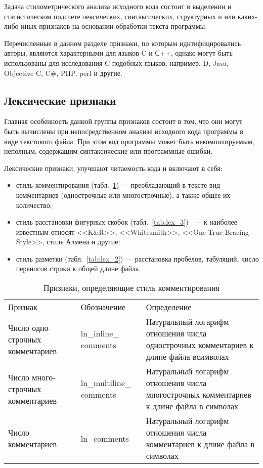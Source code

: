 Задача стилометрического анализа исходного кода состоит в выделении и статистическом подсчете 
лексических, синтаксических, структурных и или каких-либо иных признаков на основании
обработки текста программы.

Перечисленные в данном разделе признаки, по которым иднтифицировались авторы, являются характерными для языков C и С++, однако могут быть 
использованы для исследования C-подобных языков, например, D, Java, Objective C, C\#, PHP, perl и другие.

\subsection{Лексические признаки}

Главная особенность данной группы признаков состоит в том, что они могут быть вычислены при 
непосредственном анализе исходного кода программы в виде текстового файла. 
При этом код программы может быть некомпилируемым, неполным, содержащим
синтаксические или программные ошибки.

Лексические признаки, улучшают читаемость кода и включают в себя:

\begin{itemize}
 \item стиль комментирования (табл.~\ref{tab:lex_1}) --- преобладающий в тексте вид комментариев 
 (однострочные или многострочные), а также общее их количество;
 \item стиль расстановки фигурных скобок (табл.~\ref{tab:lex_3})~\cite{bracing_styles} --- к наиболее известным относят <<K\&R>>, <<Whitesmith>>,
 <<One True Bracing Style>>, стиль Алмена и другие; 
 \item стиль разметки (табл.~\ref{tab:lex_2}) --- расстановка пробелов, табуляций, число переносов строки к общей длине файла.
\end{itemize}



\begin{table}[ht!]
\caption{ Признаки, определяющие стиль комментирования }
\label{tab:lex_1}
\begin{center}
\begin{tabularx}{\linewidth}{|>{\hsize=0.2\hsize}X|>{\hsize=0.2\hsize}X|>{\hsize=0.6\hsize}X|}
\hline
\multicolumn{3}{|c|}{Стиль комментирования}\\
\hline
Признак & Обозначение & Определение \\
\hline
Число одно- строчных комментариев & ln\_inline\_ comments & Натуральный логарифм отношения числа 
однострочных комментариев к длине файла всимволах\\
\hline
Число много- строчных комментариев & ln\_multiline\_ comments & Натуральный логарифм отношения 
числа многострочных комментариев к длине файла в символах\\
\hline
Число комментариев & ln\_comments & Натуральный логарифм отношения числа комментариев к
длине файла в символах\\
\hline
\end{tabularx}
\end{center}
\end{table}


